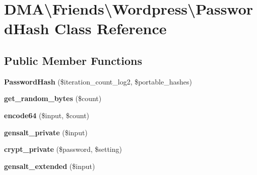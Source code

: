\hypertarget{classDMA_1_1Friends_1_1Wordpress_1_1PasswordHash}{\section{D\+M\+A\textbackslash{}Friends\textbackslash{}Wordpress\textbackslash{}Password\+Hash Class Reference}
\label{classDMA_1_1Friends_1_1Wordpress_1_1PasswordHash}
}
\subsection*{Public Member Functions}
\begin{DoxyCompactItemize}
\item 
\hypertarget{classDMA_1_1Friends_1_1Wordpress_1_1PasswordHash_abf61539343f9e65204baac22b5b21ed8}{{\bfseries Password\+Hash} (\$iteration\+\_\+count\+\_\+log2, \$portable\+\_\+hashes)}\label{classDMA_1_1Friends_1_1Wordpress_1_1PasswordHash_abf61539343f9e65204baac22b5b21ed8}

\item 
\hypertarget{classDMA_1_1Friends_1_1Wordpress_1_1PasswordHash_a5acb7a1c20642658b3953f02d4c1c5cc}{{\bfseries get\+\_\+random\+\_\+bytes} (\$count)}\label{classDMA_1_1Friends_1_1Wordpress_1_1PasswordHash_a5acb7a1c20642658b3953f02d4c1c5cc}

\item 
\hypertarget{classDMA_1_1Friends_1_1Wordpress_1_1PasswordHash_ab633a4adc389e032e55e71f79bd70340}{{\bfseries encode64} (\$input, \$count)}\label{classDMA_1_1Friends_1_1Wordpress_1_1PasswordHash_ab633a4adc389e032e55e71f79bd70340}

\item 
\hypertarget{classDMA_1_1Friends_1_1Wordpress_1_1PasswordHash_a0e069537b996e9e3bfb35adf48ea7dda}{{\bfseries gensalt\+\_\+private} (\$input)}\label{classDMA_1_1Friends_1_1Wordpress_1_1PasswordHash_a0e069537b996e9e3bfb35adf48ea7dda}

\item 
\hypertarget{classDMA_1_1Friends_1_1Wordpress_1_1PasswordHash_aebfb7c941343c626f23dbd2ccf3ba54c}{{\bfseries crypt\+\_\+private} (\$password, \$setting)}\label{classDMA_1_1Friends_1_1Wordpress_1_1PasswordHash_aebfb7c941343c626f23dbd2ccf3ba54c}

\item 
\hypertarget{classDMA_1_1Friends_1_1Wordpress_1_1PasswordHash_ad00030cab317b8ae28d465ea39d847f0}{{\bfseries gensalt\+\_\+extended} (\$input)}\label{classDMA_1_1Friends_1_1Wordpress_1_1PasswordHash_ad00030cab317b8ae28d465ea39d847f0}


\end{DoxyCompactItemize}

